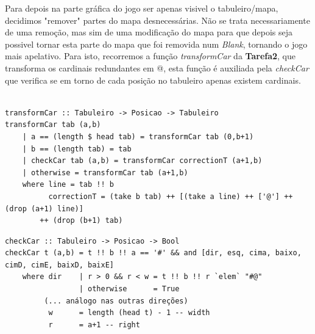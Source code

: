 \documentclass[12pt,a4paper]{report}
\begin{document}
\hfill

\hfill

Para depois na parte gráfica do jogo ser apenas visivel o tabuleiro/mapa, decidimos "remover" partes do mapa desnecessárias. 
Não se trata necessariamente de uma remoção, mas sim de uma modificação do mapa para que depois seja possivel tornar esta parte do mapa que foi removida num \emph{Blank}, tornando o jogo mais apelativo. 
Para isto, recorremos a função \emph{transformCar} da \textbf{Tarefa2}, que transforma os cardinais redundantes em @, esta função é auxiliada pela \emph{checkCar} que verifica se em torno de cada posição no tabuleiro apenas existem cardinais.\\


\begin{verbatim}

transformCar :: Tabuleiro -> Posicao -> Tabuleiro
transformCar tab (a,b)
    | a == (length $ head tab) = transformCar tab (0,b+1)
    | b == (length tab) = tab
    | checkCar tab (a,b) = transformCar correctionT (a+1,b)
    | otherwise = transformCar tab (a+1,b)
    where line = tab !! b
          correctionT = (take b tab) ++ [(take a line) ++ ['@'] ++ (drop (a+1) line)] 
        ++ (drop (b+1) tab)
\end{verbatim}

\hfill

\begin{verbatim}
checkCar :: Tabuleiro -> Posicao -> Bool
checkCar t (a,b) = t !! b !! a == '#' && and [dir, esq, cima, baixo, cimD, cimE, baixD, baixE]
    where dir    | r > 0 && r < w = t !! b !! r `elem` "#@" 
                 | otherwise      = True
         (... análogo nas outras direções)
          w      = length (head t) - 1 -- width
          r      = a+1 -- right

\end{verbatim}
\end{document}
